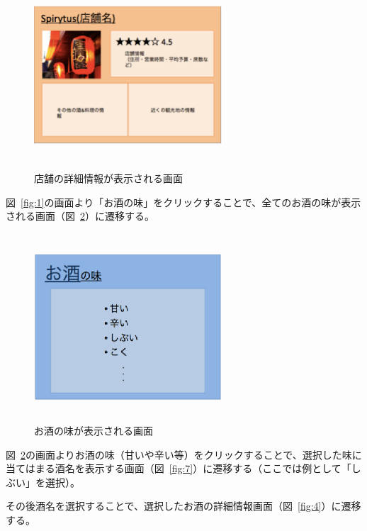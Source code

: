 \begin {figure}[!htbp]
    \begin{center}
    \includegraphics [height=7cm, width=7cm]{5.eps}
    \caption {店舗の詳細情報が表示される画面}
    \label {fig:5}
    \end{center}
\end {figure}

図~\ref{fig:1}の画面より「お酒の味」をクリックすることで、全てのお酒の味が表示される画面（図~\ref{fig:6}）に遷移する。
\clearpage
\begin {figure}[!htbp]
    \begin{center}
    \includegraphics [height=7cm, width=7cm]{6.eps}
    \caption {お酒の味が表示される画面}
    \label {fig:6}
    \end{center}
\end {figure}
図~\ref{fig:6}の画面よりお酒の味（甘いや辛い等）をクリックすることで、選択した味に当てはまる酒名を表示する画面（図~\ref{fig:7}）に遷移する（ここでは例として「しぶい」を選択）。



その後酒名を選択することで、選択したお酒の詳細情報画面（図~\ref{fig:4}）に遷移する。

